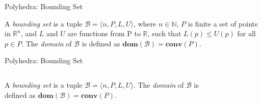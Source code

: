 \begin{frame}[fragile]{Polyhedra: Bounding Set}
    \begin{definition} A \emph{bounding set} is a tuple $\mathcal{B} = \langle n,P, L, U \rangle$, where $n \in \mathbb{N}$, $P$ is finite a set of points in $\mathbb{R}^n$, and $L$ and $U$ are functions from P to $\mathbb{R}$, such that $ L(p) \leq U(p) $ for all $ p \in P. $ The \emph{domain} of $\mathcal{B}$ is defined as $\mathbf{dom}(\mathcal{B})=\mathbf{conv}(P)$.
    \end{definition}
\end{frame}

\begin{frame}[fragile]{Polyhedra: Bounding Set}
    \begin{columns}
        \begin{column}{0.3\textwidth}
            \begin{definition} A \emph{bounding set} is a tuple $\mathcal{B} = \langle n,P, L, U \rangle$. The \emph{domain} of $\mathcal{B}$ is defined as $\mathbf{dom}(\mathcal{B})=\mathbf{conv}(P)$.
            \end{definition}
        \end{column}
        \begin{column}{0.7\textwidth}
            \begin{figure}
                                
            \end{figure}
        \end{column}
    \end{columns}
\end{frame}

